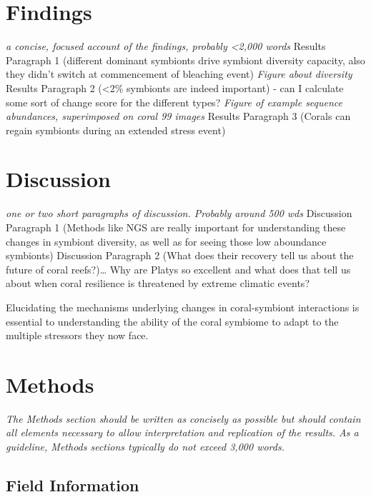 \documentclass[]{article}
\begin{document}
\section{Findings}\label{findings}

\emph{a concise, focused account of the findings, probably
\textless{}2,000 words} Results Paragraph 1 (different dominant
symbionts drive symbiont diversity capacity, also they didn't switch at
commencement of bleaching event) \emph{Figure about diversity} Results
Paragraph 2 (\textless{}2\% symbionts are indeed important) - can I
calculate some sort of change score for the different types?
\emph{Figure of example sequence abundances, superimposed on coral 99
images} Results Paragraph 3 (Corals can regain symbionts during an
extended stress event)

\section{Discussion}\label{discussion}

\emph{one or two short paragraphs of discussion. Probably around 500
wds} Discussion Paragraph 1 (Methods like NGS are really important for
understanding these changes in symbiont diversity, as well as for seeing
those low aboundance symbionts) Discussion Paragraph 2 (What does their
recovery tell us about the future of coral reefs?)\ldots{} Why are
Platys so excellent and what does that tell us about when coral
resilience is threatened by extreme climatic events?

Elucidating the mechanisms underlying changes in coral-symbiont
interactions is essential to understanding the ability of the coral
symbiome to adapt to the multiple stressors they now face.

\section{Methods}\label{methods}

\emph{The Methods section should be written as concisely as possible but
should contain all elements necessary to allow interpretation and
replication of the results. As a guideline, Methods sections typically
do not exceed 3,000 words.}

\subsection{Field Information}\label{field-information}
\end{document}
